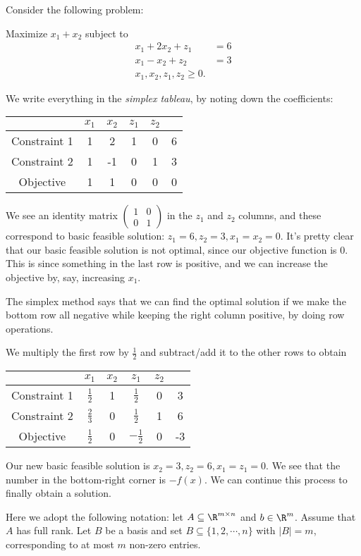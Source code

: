 \documentclass[a4paper]{article}
\begin{document}
\begin{eg}
  Consider the following problem:
  \begin{center}
    Maximize $x_1 + x_2$ subject to
    \begin{align*}
      x_1 + 2x_2 + z_1 &= 6\\
      x_1 - x_2 + z_2 &= 3\\
      x_1, x_2, z_1, z_2 \geq 0.
    \end{align*}
  \end{center}

  We write everything in the \emph{simplex tableau}, by noting down the coefficients:
  \begin{center}
    \begin{tabular}{cccccc}
      \toprule
      &$x_1$ & $x_2$ & $z_1$ & $z_2$ \\
      \midrule
      Constraint 1 & 1 & 2 & 1 & 0 & 6 \\
      Constraint 2 & 1 & -1 & 0 & 1 & 3 \\
      Objective & 1 & 1 & 0 & 0 & 0 \\
      \bottomrule
    \end{tabular}
  \end{center}
  We see an identity matrix $\begin{pmatrix} 1 & 0\\ 0 & 1\end{pmatrix}$ in the $z_1$ and $z_2$ columns, and these correspond to basic feasible solution: $z_1 = 6, z_2 = 3, x_1 = x_2 = 0$. It's pretty clear that our basic feasible solution is not optimal, since our objective function is $0$. This is since something in the last row is positive, and we can increase the objective by, say, increasing $x_1$.

  The simplex method says that we can find the optimal solution if we make the bottom row all negative while keeping the right column positive, by doing row operations.

  We multiply the first row by $\frac{1}{2}$ and subtract/add it to the other rows to obtain
  \begin{center}
    \begin{tabular}{cccccc}
      \toprule
      &$x_1$ & $x_2$ & $z_1$ & $z_2$ & \\
      \midrule
      Constraint 1 & $\frac{1}{2}$ & 1 & $\frac{1}{2}$ & 0 & 3 \\
      Constraint 2 & $\frac{2}{3}$ & 0 & $\frac{1}{2}$ & 1 & 6 \\
      Objective & $\frac{1}{2}$ & 0 & $-\frac{1}{2}$ & 0 & -3\\
      \bottomrule
    \end{tabular}
  \end{center}
  Our new basic feasible solution is $x_2 = 3, z_2 = 6, x_1 = z_1 = 0$. We see that the number in the bottom-right corner is $-f(x)$. We can continue this process to finally obtain a solution.
\end{eg}
Here we adopt the following notation: let $A\subseteq \R^{m\times n}$ and $b\in \R^m$. Assume that $A$ has full rank. Let $B$ be a basis and set $B\subseteq \{1, 2, \cdots, n\}$ with $|B| = m$, corresponding to at most $m$ non-zero entries.
\end{document}
